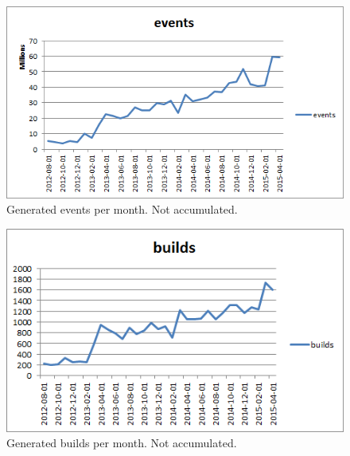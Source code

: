 %

\begin{figure}[h!]
\centering
\includegraphics[]{figure/events.png}
\caption{Generated events per month. Not accumulated.}
\label{fig:events}
\end{figure}

\begin{figure}[h!]
\centering
\includegraphics[]{figure/builds.png}
\caption{Generated builds per month. Not accumulated.}
\label{fig:builds}
\end{figure}


